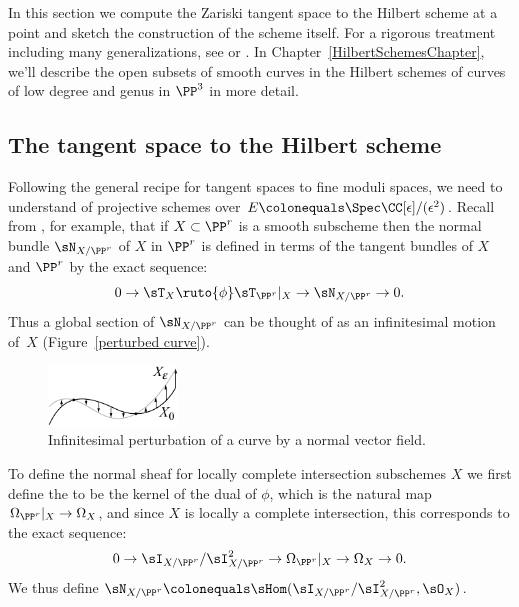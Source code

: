 In this section
we
compute
the Zariski tangent space to the Hilbert scheme at a point and
%
%
sketch the construction of the scheme itself. For a rigorous
treatment including many generalizations,  see \cite{HomogHilbert}
or \cite{MR2222646}. In Chapter~\ref{HilbertSchemesChapter}, we'll
describe  the
open subsets of smooth curves in the Hilbert schemes of curves of low
degree and genus in $\PP^3$ in more detail.

\subsection{The tangent space to the Hilbert scheme}

Following the general recipe for tangent spaces to fine moduli spaces,
we need to understand
%
of projective schemes over $E \colonequals  \Spec
\CC[\eps]/(\eps^2)$. Recall
from
\cite[p.\,182]{Hartshorne1977},
for example,
that if
$X\subset \PP^r$ is a smooth subscheme then
 the normal bundle $\sN_{X/\PP^r}$ of $X$ in $\PP^r$ is defined in terms
 of the tangent bundles
 of $X$ and $\PP^r$ by the exact sequence:
$$
0\to \sT_X \ruto {\phi} \sT_{\PP^r}|_X \to \sN_{X/\PP^r} \to 0.
$$
Thus a global section of
$\sN_{X/\PP^r}$
%
can be thought of as an infinitesimal motion of~$X$ (Figure~\ref{perturbed
curve}).

\begin{figure}
\centerline {\includegraphics[width=1.35in]{"main/Fig06-0"}}
\vskip-5pt
 \caption{Infinitesimal perturbation of a curve by a normal vector field.}
 \label{perturbed curve}
\end{figure}

To define the normal sheaf for locally complete intersection subschemes
$X$ we first define the
%
to be the kernel of the dual  of $\phi$, which is the natural map
$\Omega_{\PP^r}|_X \to \Omega_X$,
and since $X$ is locally a complete intersection, this corresponds to
the exact sequence:
$$
0\to \sI_{X/\PP^r}/\sI_{X/\PP^r}^2 \to \Omega_{\PP^r}|_X \to \Omega_X
\to 0.
$$
We thus define $\sN_{X/\PP^r} \colonequals
\sHom(\sI_{X/\PP^r}/\sI_{X/\PP^r}^2, \sO_X)$.

